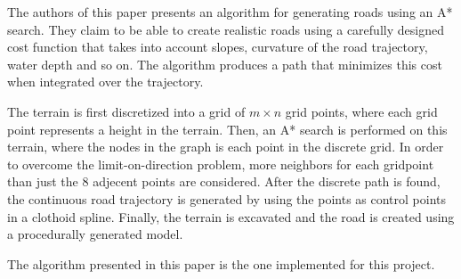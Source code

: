
The authors of this paper presents an algorithm for generating roads using an A* search. They claim to be able to create realistic roads using a carefully designed cost function that takes into account slopes, curvature of the road trajectory, water depth and so on. The algorithm produces a path that minimizes this cost when integrated over the trajectory. 

The terrain is first discretized into a grid of $m\times n$ grid points, where each grid point represents a height in the terrain. Then, an A* search is performed on this terrain, where the nodes in the graph is each point in the discrete grid. In order to overcome the limit-on-direction problem, more neighbors for each gridpoint than just the 8 adjecent points are considered. After the discrete path is found, the continuous road trajectory is generated by using the points as control points in a clothoid spline. Finally, the terrain is excavated and the road is created using a procedurally generated model. 

The algorithm presented in this paper is the one implemented for this project.




%
%
%
%
%
